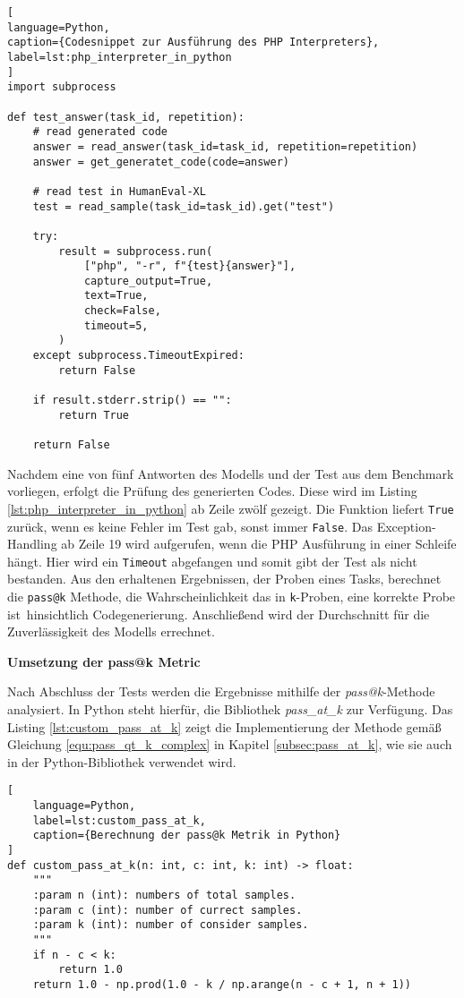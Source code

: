 \begin{lstlisting}[
language=Python,
caption={Codesnippet zur Ausführung des PHP Interpreters},
label=lst:php_interpreter_in_python
]
import subprocess

def test_answer(task_id, repetition):
    # read generated code
    answer = read_answer(task_id=task_id, repetition=repetition)
    answer = get_generatet_code(code=answer)

    # read test in HumanEval-XL
    test = read_sample(task_id=task_id).get("test")

    try:
        result = subprocess.run(
            ["php", "-r", f"{test}{answer}"],
            capture_output=True,
            text=True,
            check=False,
            timeout=5,
        )
    except subprocess.TimeoutExpired:
        return False

    if result.stderr.strip() == "":
        return True

    return False
\end{lstlisting}

Nachdem eine von fünf Antworten des Modells und der Test aus dem Benchmark vorliegen, erfolgt die Prüfung des generierten Codes. Diese wird im Listing \ref{lst:php_interpreter_in_python} ab Zeile zwölf gezeigt. Die Funktion liefert \texttt{True} zurück, wenn es keine Fehler im Test gab, sonst immer \texttt{False}. Das Exception-Handling ab Zeile 19 wird aufgerufen, wenn die PHP Ausführung in einer Schleife hängt. Hier wird ein \texttt{Timeout} abgefangen und somit gibt der Test als nicht bestanden. Aus den erhaltenen Ergebnissen, der Proben eines Tasks, berechnet die \texttt{pass@k} Methode, die \glqq Wahrscheinlichkeit das in \texttt{k}-Proben, eine korrekte Probe ist\grqq \, hinsichtlich Codegenerierung. Anschließend wird der Durchschnitt für die Zuverlässigkeit des Modells errechnet.\vspace{0.2cm}

\textbf{Umsetzung der pass@k Metric}\vspace{0.2cm}

Nach Abschluss der Tests werden die Ergebnisse mithilfe der \textit{pass@k}-Methode analysiert. In Python steht hierfür, die Bibliothek \textit{pass\_at\_k} zur Verfügung. Das Listing \ref{lst:custom_pass_at_k} zeigt die Implementierung der Methode gemäß Gleichung \ref{equ:pass_qt_k_complex} in Kapitel \ref{subsec:pass_at_k}, wie sie auch in der Python-Bibliothek verwendet wird.  


\begin{lstlisting}[
	language=Python,
	label=lst:custom_pass_at_k,
	caption={Berechnung der pass@k Metrik in Python}
]
def custom_pass_at_k(n: int, c: int, k: int) -> float:
    """
    :param n (int): numbers of total samples.
    :param c (int): number of currect samples.
    :param k (int): number of consider samples.
    """
    if n - c < k:
        return 1.0
    return 1.0 - np.prod(1.0 - k / np.arange(n - c + 1, n + 1))
\end{lstlisting}

